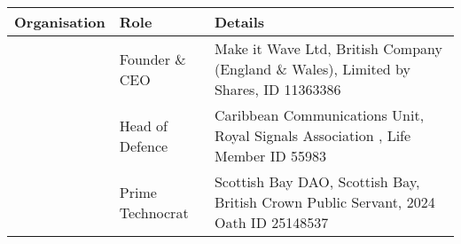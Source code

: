 \documentclass[letterpaper,10pt,english]{sphinxmanual}
\begin{document}
\begin{savenotes}\sphinxattablestart
\centering
\begin{tabulary}{\linewidth}[t]{|T|T|T|}
\hline
\sphinxstyletheadfamily 
Organisation
&\sphinxstyletheadfamily 
Role
&\sphinxstyletheadfamily 
Details
\\
\hline
\noindent{}
&
Founder \& CEO
&
Make it Wave Ltd, British Company (England \& Wales), Limited by Shares, ID 11363386
\\
\hline
\noindent{}
&
Head of Defence
&
Caribbean Communications Unit, Royal Signals Association , Life Member ID 55983
\\
\hline
\noindent{}
&
Prime Technocrat
&
Scottish Bay DAO, Scottish Bay, British Crown Public Servant, 2024 Oath ID 25148537
\\
\hline
\end{tabulary}
\par
\sphinxattableend\end{savenotes}



\renewcommand{\indexname}{Index}
\printindex
\end{document}
